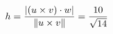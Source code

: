 \documentclass[preview]{standalone}
\begin{document}
\begin{align*}
\special{dvisvgm:raw <g id='unique000'>}h=\frac{|(u\times v)\cdot w|}{\|u\times v\|}=\frac{10}{\sqrt{14}}\special{dvisvgm:raw </g>}
\end{align*}
\end{document}

